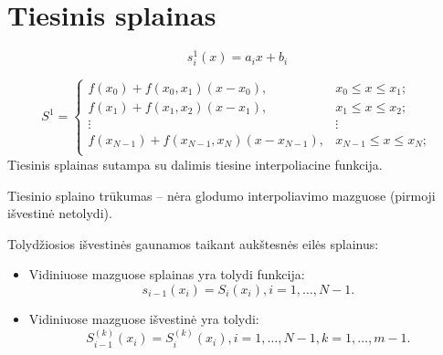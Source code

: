 \section{Tiesinis splainas}


\begin{equation*}
  s_{i}^{1}(x) = a_{i}x + b_{i}
\end{equation*}




\begin{equation*}
  S^{1} = 
  \begin{cases}
    f(x_{0}) + f(x_{0},x_{1})(x-x_{0}), & x_{0} \leq x \leq x_{1}; \\
    f(x_{1}) + f(x_{1},x_{2})(x-x_{1}), & x_{1} \leq x \leq x_{2}; \\
    \vdots & \vdots \\
    f(x_{N-1}) + f(x_{N-1},x_{N})(x-x_{N-1}), & x_{N-1} \leq x \leq x_{N}; \\
  \end{cases}
\end{equation*}
Tiesinis splainas sutampa su dalimis tiesine interpoliacine funkcija.





Tiesinio splaino trūkumas – nėra glodumo interpoliavimo mazguose
(pirmoji išvestinė netolydi).

Tolydžiosios išvestinės gaunamos taikant aukštesnės eilės splainus:
\begin{itemize}
  \item Vidiniuose mazguose splainas yra tolydi funkcija:
    \begin{equation*}
      s_{i-1}(x_{i}) = S_{i}(x_{i}), i=1,\ldots,N-1.
    \end{equation*}
  \item Vidiniuose mazguose išvestinė yra tolydi:
    \begin{equation*}
      S_{i-1}^{(k)}(x_{i}) = S_{i}^{(k)}(x_{i}), i=1,\ldots,N-1, k=1,\ldots,m-1.
    \end{equation*}
\end{itemize}


